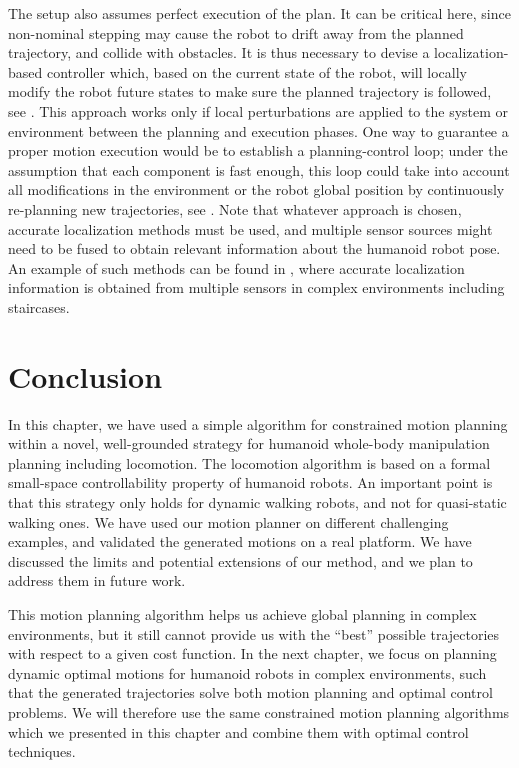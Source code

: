 The setup also assumes perfect execution of the plan. It can be
critical here, since non-nominal stepping may cause the robot to drift
away from the planned trajectory, and collide with obstacles. It is
thus necessary to devise a localization-based controller which, based
on the current state of the robot, will locally modify the robot
future states to make sure the planned trajectory is followed, see
\cite{moulard2012trajectory}. This approach works only if local
perturbations are applied to the system or environment between the
planning and execution phases. One way to guarantee a proper motion
execution would be to establish a planning-control loop; under the
assumption that each component is fast enough, this loop could take
into account all modifications in the environment or the robot global
position by continuously re-planning new trajectories, see
\cite{baudouin2011real}. Note that whatever approach is chosen,
accurate localization methods must be used, and multiple sensor
sources might need to be fused to obtain relevant information about
the humanoid robot pose. An example of such methods can be found in
\cite{hornung2010humanoid}, where accurate localization information is
obtained from multiple sensors in complex environments including
staircases.

\section{Conclusion}

In this chapter, we have used a simple algorithm for constrained
motion planning within a novel, well-grounded strategy for humanoid
whole-body manipulation planning including locomotion. The locomotion
algorithm is based on a formal small-space controllability property of
humanoid robots. An important point is that this strategy only holds
for dynamic walking robots, and not for quasi-static walking ones. We
have used our motion planner on different challenging examples, and
validated the generated motions on a real platform. We have discussed
the limits and potential extensions of our method, and we plan to
address them in future work.

\bigskip

This motion planning algorithm helps us achieve global planning in
complex environments, but it still cannot provide us with the ``best''
possible trajectories with respect to a given cost function. In the
next chapter, we focus on planning dynamic optimal motions for
humanoid robots in complex environments, such that the generated
trajectories solve both motion planning and optimal control
problems. We will therefore use the same constrained motion planning
algorithms which we presented in this chapter and combine them with
optimal control techniques.
